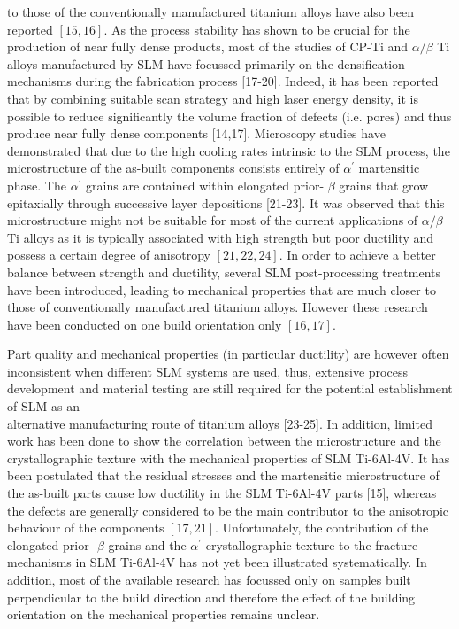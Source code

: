 \documentclass[10pt]{article}
\begin{document}
to those of the conventionally manufactured titanium alloys have also been reported $[15,16]$. As the process stability has shown to be crucial for the production of near fully dense products, most of the studies of CP-Ti and $\alpha / \beta$ Ti alloys manufactured by SLM have focussed primarily on the densification mechanisms during the fabrication process [17-20]. Indeed, it has been reported that by combining suitable scan strategy and high laser energy density, it is possible to reduce significantly the volume fraction of defects (i.e. pores) and thus produce near fully dense components [14,17]. Microscopy studies have demonstrated that due to the high cooling rates intrinsic to the SLM process, the microstructure of the as-built components consists entirely of $\alpha^{\prime}$ martensitic phase. The $\alpha^{\prime}$ grains are contained within elongated prior- $\beta$ grains that grow epitaxially through successive layer depositions [21-23]. It was observed that this microstructure might not be suitable for most of the current applications of $\alpha / \beta$ Ti alloys as it is typically associated with high strength but poor ductility and possess a certain degree of anisotropy $[21,22,24]$. In order to achieve a better balance between strength and ductility, several SLM post-processing treatments have been introduced, leading to mechanical properties that are much closer to those of conventionally manufactured titanium alloys. However these research have been conducted on one build orientation only $[16,17]$.

Part quality and mechanical properties (in particular ductility) are however often inconsistent when different SLM systems are used, thus, extensive process development and material testing are still required for the potential establishment of SLM as an\\
alternative manufacturing route of titanium alloys [23-25]. In addition, limited work has been done to show the correlation between the microstructure and the crystallographic texture with the mechanical properties of SLM Ti-6Al-4V. It has been postulated that the residual stresses and the martensitic microstructure of the as-built parts cause low ductility in the SLM Ti-6Al-4V parts [15], whereas the defects are generally considered to be the main contributor to the anisotropic behaviour of the components $[17,21]$. Unfortunately, the contribution of the elongated prior- $\beta$ grains and the $\alpha^{\prime}$ crystallographic texture to the fracture mechanisms in SLM Ti-6Al-4V has not yet been illustrated systematically. In addition, most of the available research has focussed only on samples built perpendicular to the build direction and therefore the effect of the building orientation on the mechanical properties remains unclear.
\end{document}
